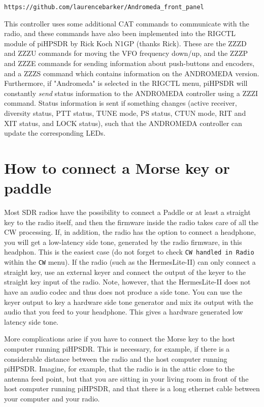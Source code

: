 \documentclass[12pt]{book}
\def\rett#1{\texttt{\color{red}#1}}
\def\bltt#1{\texttt{\color{blue}#1}}
\begin{document}
\texttt{https://github.com/laurencebarker/Andromeda\_front\_panel}

This controller uses some additional CAT commands to communicate with the radio, and these commands have 
also been implemented into 
the RIGCTL module of piHPSDR by Rick Koch N1GP (thanks Rick). These are the ZZZD and ZZZU commands for 
moving the VFO frequency
down/up, and the ZZZP and ZZZE commands for sending information about push-buttons and encoders, and a ZZZS 
command which
contains information on the ANDROMEDA version. Furthermore, if "Andromeda" is selected in the RIGCTL menu, 
piHPSDR will constantly
\textit{send} status information to the ANDROMEDA controller using a ZZZI command. Status information is 
sent if something
changes (active receiver,  diversity status, PTT status, TUNE mode, PS status, CTUN mode, RIT and XIT 
status, and LOCK status),
such that the ANDROMEDA controller can update the corresponding LEDs.

\chapter[Connect a Morse Key]{How to connect a Morse key or paddle}
\label{sec:ConnectCW}

Most SDR radios have the possibility to connect a Paddle or at least a straight key to the
radio itself, and then the firmware inside the radio takes care of all the CW processing.
If, in addition, the radio has the option to  connect a headphone, you will get a low-latency
side tone, generated by the radio firmware, in this headphon.
This is the easiest case (do not forget to check \rett{CW handled in Radio} within the
\bltt{CW} menu). If the radio (such as the HermesLite-II) can only connect a straight key,
use an external keyer and connect the output of the keyer to the straight key input of the radio.
Note, however, that the HermesLite-II does not have an audio codec and thus does not produce a
side tone. You can use the keyer output to key a hardware side tone generator and mix its
output with the audio that you feed to your headphone. This gives a hardware generated low
latency side tone.

More complications arise if you have to connect the Morse key to the host computer running
piHPSDR. This is necessary, for example, if there is a considerable distance between the
radio and the host computer running piHPSDR. Imagine, for example, that the radio is
in the attic close to the antenna feed point, but that you are sitting in your living room
in front of the host computer running piHPSDR, and that there is a long ethernet cable
between your computer and your radio.
\end{document}
